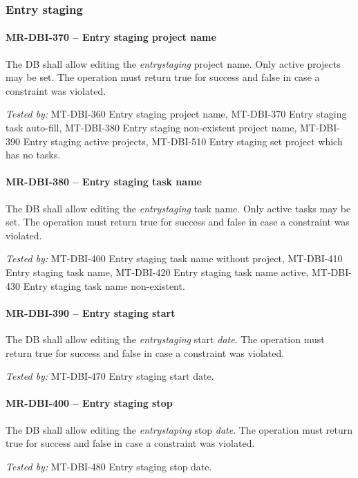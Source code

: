 \subsubsection{Entry staging}
\paragraph{MR-DBI-370 -- Entry staging project name}
The \gls{DB} shall allow editing the \emph{entrystaging} project name.
Only active projects may be set.
The operation must return true for success and false in case a
constraint was violated.

\textit{Tested by: } MT-DBI-360 Entry staging project name,
MT-DBI-370 Entry staging task auto-fill,
MT-DBI-380 Entry staging non-existent project name,
MT-DBI-390 Entry staging active projects,
MT-DBI-510 Entry staging set project which has no tasks.

\paragraph{MR-DBI-380 -- Entry staging task name}
The \gls{DB} shall allow editing the \emph{entrystaging} task name.
Only active tasks may be set.
The operation must return true for success and false in case a
constraint was violated.

\textit{Tested by: } MT-DBI-400 Entry staging task name without project,
MT-DBI-410 Entry staging task name,
MT-DBI-420 Entry staging task name active,
MT-DBI-430 Entry staging task name non-existent.

\paragraph{MR-DBI-390 -- Entry staging start}
The \gls{DB} shall allow editing the \emph{entrystaging} start \emph{date}.
The operation must return true for success and false in case a
constraint was violated.

\textit{Tested by: } MT-DBI-470 Entry staging start date.

\paragraph{MR-DBI-400 -- Entry staging stop}
The \gls{DB} shall allow editing the \emph{entrystaping} stop \emph{date}.
The operation must return true for success and false in case a
constraint was violated.

\textit{Tested by: } MT-DBI-480 Entry staging stop date.

